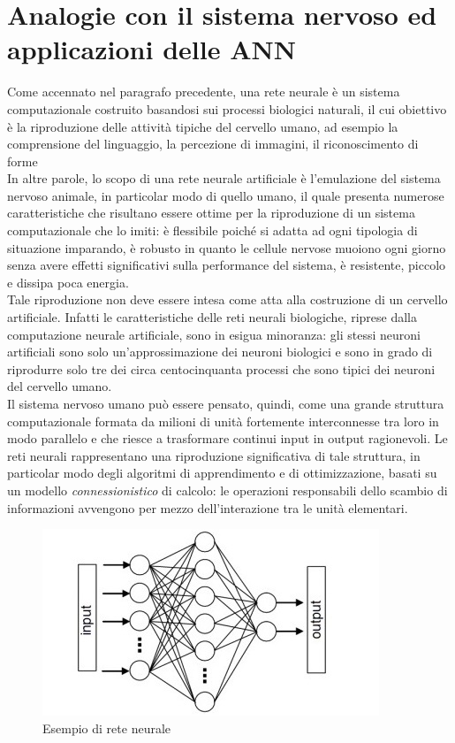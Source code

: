 \documentclass[12pt,a4paper,oneside]{book}
\begin{document}
		
		
		
	\section{Analogie con il sistema nervoso ed applicazioni delle ANN}
	
		Come accennato nel paragrafo precedente, una rete neurale è un sistema computazionale costruito basandosi sui processi biologici naturali, il cui obiettivo è la riproduzione delle attività tipiche del cervello umano, ad esempio la comprensione del linguaggio, la percezione di immagini, il riconoscimento di forme  \\
		In altre parole, lo scopo di una rete neurale artificiale è l’emulazione del sistema nervoso animale, in particolar modo di quello umano, il quale presenta numerose caratteristiche che risultano essere ottime per la riproduzione di un sistema computazionale che lo imiti: è flessibile poiché si adatta ad ogni tipologia di situazione imparando, è robusto in quanto le cellule nervose muoiono ogni giorno senza avere effetti significativi sulla performance del sistema, è resistente, piccolo e dissipa poca energia. \\
		Tale riproduzione non deve essere intesa come atta alla costruzione di un cervello artificiale. Infatti le caratteristiche delle reti neurali biologiche, riprese dalla computazione neurale artificiale, sono in esigua minoranza: gli stessi neuroni artificiali sono solo un’approssimazione dei neuroni biologici e sono in grado di riprodurre solo tre dei circa centocinquanta processi che sono tipici dei neuroni del cervello umano.\\
		Il sistema nervoso umano può essere pensato, quindi, come una grande struttura computazionale formata da milioni di unità fortemente interconnesse tra loro in modo parallelo e che riesce a trasformare continui input in output ragionevoli. Le reti neurali rappresentano una riproduzione significativa di tale struttura, in particolar modo degli algoritmi di apprendimento e di ottimizzazione, basati su un modello \emph{connessionistico} di calcolo: le operazioni responsabili dello scambio di informazioni avvengono per mezzo dell'interazione tra le unità elementari.\\
	
		\begin{figure}[h]
			\centering
			\includegraphics[width=0.6\linewidth]{IMMAGINI/esempioiniziale}
			\caption{Esempio di rete neurale}
			\label{fig:esempio}
		\end{figure}
		
\end{document}
